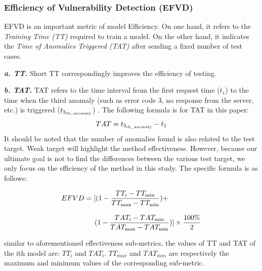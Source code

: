 \subsubsection{\textbf{Efficiency of Vulnerability Detection (EFVD)}}
EFVD is an important metric of model Efficiency. On one hand, it refers to the \textit{Training Time (TT)} required to train a model. On the other hand, it indicates the \textit{Time of Anomalies Triggered (TAT)} after sending a fixed number of test cases. 

\quad \textit{\textbf{a. TT.}} Short TT correspondingly improves the efficiency of testing.

\quad \textit{\textbf{b. TAT.}} TAT refers to the time interval from the first request time (${t_1}$) to the time when the third anomaly (such as error code 3, no response from the server, etc.) is triggered (${t_{{3_{{\rm{th\_anomaly}}}}}}$) . The following formula is for TAT in this paper:
\begin{equation}
TAT={t_{{3_{{\rm{th\_anomaly}}}}}} - {t_1}  
\end{equation}
It should be noted that the number of anomalies found is also related to the test target. Weak target will highlight the method effectiveness. However, because our ultimate goal is not to find the differences between the various test target, we only focus on the efficiency of the method in this study. The specific formula is as follows:

\begin{equation}
\begin{array}{l}
EFVD = \displaystyle[(1 - \frac{{T{T_i} - T{T_{\min }}}}{{T{T_{\max }} - T{T_{\min }}}}) + \\
\\{\kern 1pt} {\kern 1pt} {\kern 1pt} {\kern 1pt} {\kern 1pt} {\kern 1pt} {\kern 1pt} {\kern 1pt} {\kern 1pt} {\kern 1pt} {\kern 1pt} {\kern 1pt} {\kern 1pt} {\kern 1pt} {\kern 1pt} {\kern 1pt} {\kern 1pt} {\kern 1pt} {\kern 1pt} {\kern 1pt} {\kern 1pt} {\kern 1pt} {\kern 1pt} {\kern 1pt} {\kern 1pt} {\kern 1pt} {\kern 1pt} {\kern 1pt} {\kern 1pt} {\kern 1pt} {\kern 1pt} {\kern 1pt} {\kern 1pt} {\kern 1pt} {\kern 1pt} {\kern 1pt} {\kern 1pt} {\kern 1pt} {\kern 1pt} {\kern 1pt} {\kern 1pt} {\kern 1pt} {\kern 1pt} {\kern 1pt} {\kern 1pt} {\kern 1pt} {\kern 1pt} 
\displaystyle(1 - \frac{{TA{T_i} - TA{T_{\min }}}}{{TA{T_{\max }} - TA{T_{\min }}}})]  
\times  \displaystyle\frac{{100 \% }}{2}
\end{array}
\end{equation}

similar to aforementioned effectiveness sub-metrics, the values of TT and TAT of the ith model are: ${TT_i}$ and ${TAT_i}$. ${{TT}_{max}}$ and ${{TAT}_{min}}$ are respectively the maximum and minimum values of the corresponding sub-metric.

